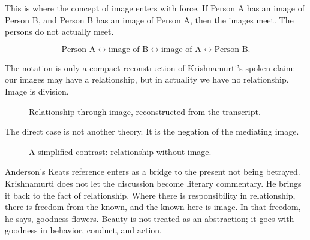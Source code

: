 This is where the concept of image enters with force. If Person A has an image of Person B, and Person B has an image of Person A, then the images meet. The persons do not actually meet.

\begin{equation}
\text{Person A}
\leftrightarrow
\text{image of B}
\leftrightarrow
\text{image of A}
\leftrightarrow
\text{Person B}.
\end{equation}

The notation is only a compact reconstruction of Krishnamurti's spoken claim: our images may have a relationship, but in actuality we have no relationship. Image is division.

\begin{figure}
\centering
{}
\caption{Relationship through image, reconstructed from the transcript.}
\end{figure}

The direct case is not another theory. It is the negation of the mediating image.

\begin{figure}
\centering
{}
\caption{A simplified contrast: relationship without image.}
\end{figure}

Anderson's Keats reference enters as a bridge to the present not being betrayed. Krishnamurti does not let the discussion become literary commentary. He brings it back to the fact of relationship. Where there is responsibility in relationship, there is freedom from the known, and the known here is image. In that freedom, he says, goodness flowers. Beauty is not treated as an abstraction; it goes with goodness in behavior, conduct, and action.

